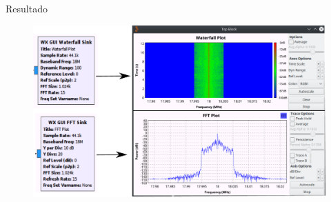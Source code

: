 \begin{frame}{Resultado}

\begin{figure}[H]
\centering
\vspace{-3mm}
\includegraphics[width=\textwidth]{parte3/lab15/pdf/lab15_5.pdf}
\end{figure}

\end{frame}
